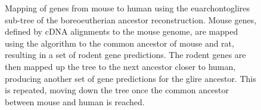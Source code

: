 \begin{figure}
\centering {}  \caption{Mapping of genes from mouse to human using the
euarchontoglires sub-tree of the boreoeutherian ancestor
reconstruction. Mouse genes, defined by cDNA alignments to the mouse
genome, are mapped using the \TransMap algorithm to the common
ancestor of mouse and rat, resulting in a set of rodent gene
predictions. The rodent genes are then mapped up the tree to the
next ancestor closer to human, producing another set of gene
predictions for the glire ancestor. This is repeated, moving down
the tree once the common ancestor between mouse and human is
reached.} \label{fig:ancestorMapping}
\end{figure}
